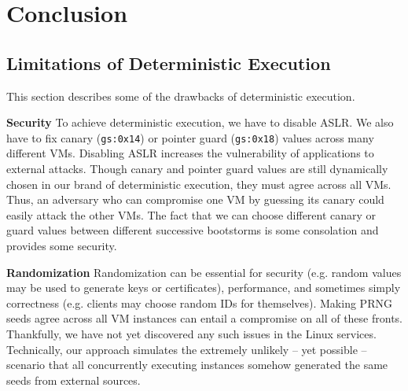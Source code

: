 \chapter{Conclusion} \label{ch:conc}

\section{Limitations of Deterministic Execution} \label{ch3:issues}
This section describes some of the drawbacks
of deterministic execution. \newline

\noindent \textbf{Security} \newline
To achieve deterministic execution,
we have to disable ASLR. We also have to fix 
canary (\texttt{gs:0x14}) or pointer guard (\texttt{gs:0x18})
 values across many different VMs.
Disabling ASLR increases the vulnerability of
applications to external attacks. 
Though canary and pointer guard
values are still dynamically chosen in
our brand of deterministic execution, 
they must agree across all VMs. Thus,
an adversary  who can compromise one VM by
guessing its canary could easily attack the other VMs.
The fact that we can choose different
canary or guard values between different successive bootstorms
is some consolation and provides some security. \newline

\noindent \textbf{Randomization} \newline
Randomization can be essential for security (e.g. random values
may be used to generate keys or certificates),
performance, and sometimes simply correctness (e.g. 
clients may choose random IDs for themselves).
Making PRNG seeds agree across all VM instances can entail
a compromise on all of these fronts.
Thankfully, we have not yet discovered any such
issues in the Linux services. Technically,
our approach simulates the extremely unlikely 
-- yet possible -- scenario that all concurrently executing
instances somehow generated the same seeds
from external sources. \newline

